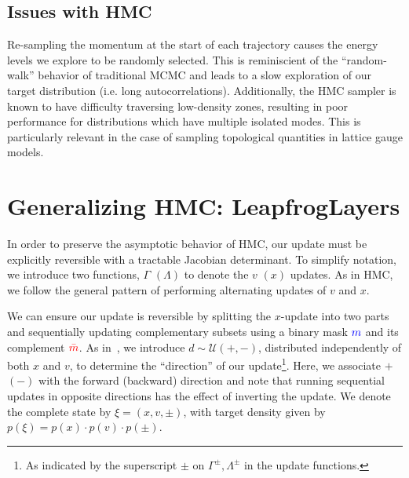 \documentclass[a4paper,11pt]{article}
\newcommand{\mask}{\textcolor{blue}{{m}}}
\newcommand{\maskbar}{\textcolor{red}{\bar{m}}}
\begin{document}
\subsection{\label{subsec:hmc_issues}Issues with HMC}
%
Re-sampling the momentum at the start of each trajectory causes the energy
levels we explore to be randomly selected.
%
This is reminiscient of the ``random-walk'' behavior of traditional MCMC and
leads to a slow exploration of our target distribution (i.e. long
autocorrelations).
%
Additionally, the HMC sampler is known to have difficulty traversing
low-density zones, resulting in poor performance for distributions which have
multiple isolated modes.
%
This is particularly relevant in the case of sampling topological quantities in
lattice gauge models.
%
%
%
\section{\label{sec:l2hmc}Generalizing HMC: LeapfrogLayers}
%
In order to preserve the asymptotic behavior of HMC, our update must be
explicitly reversible with a tractable Jacobian determinant.
%
To simplify notation, we introduce two functions, \(\Gamma\) \((\Lambda)\) to
denote the \(v\) \((x)\) updates.
%
As in HMC, we follow the general pattern of performing alternating updates of
\(v\) and \(x\).
%

We can ensure our update is reversible by splitting the \(x\)-update into two
parts and sequentially updating complementary subsets using a binary mask
\(\mask\) and its complement \(\maskbar\).
%
As in~\cite{2017arXiv171109268L,Foreman:2021ixr}, we introduce \(d \sim
\mathcal{U} (+, -)\), distributed independently of both \(x\) and \(v\), to
determine the ``direction'' of our update\footnote{%
  As indicated by the superscript \(\pm\) on \(\Gamma^{\pm}, \Lambda^{\pm}\) in
  the update functions.
}.
%
Here, we associate \(+\) \((-)\) with the forward (backward) direction and note
that running sequential updates in opposite directions has the effect of
inverting the update.
%
We denote the complete state by \(\xi = (x, v, \pm)\), with target density
given by \(p(\xi) = p(x)\cdot p(v)\cdot p(\pm)\).
%
\end{document}
